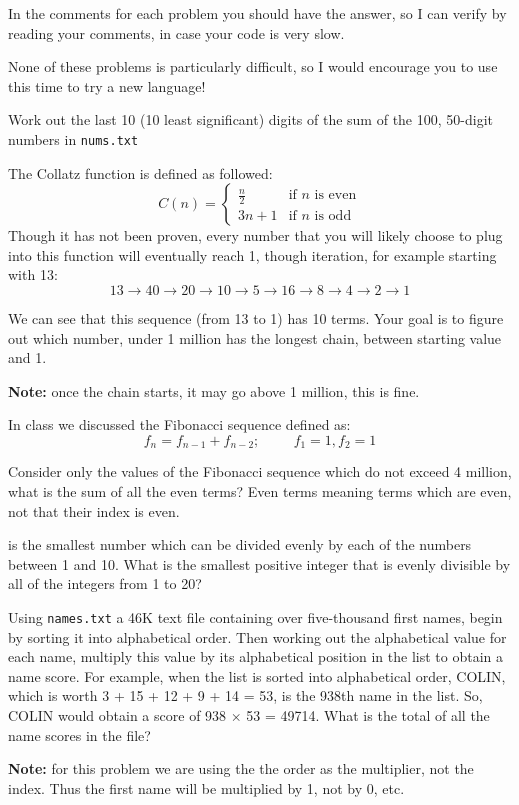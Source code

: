 \documentclass[addpoints]{exam}
\begin{document}
In the comments for each problem you should have the answer, so I can verify by
reading your comments, in case your code is very slow.

None of these problems is particularly difficult, so I would encourage you to
use this time to try a new language!

\begin{questions}
  \question[10] Work out the last 10 (10 least significant) digits of the sum of
  the 100, 50-digit numbers in \texttt{nums.txt}

  \question[10] The Collatz function is defined as followed:
  \[
    C(n) = \begin{cases}
      \frac n2 & \mbox{if } n \text{ is even}\\
      3n+1 & \mbox{if } n \text{ is odd}
    \end{cases}
  \]
  Though it has not been proven, every number that you will likely choose to
  plug into this function will eventually reach 1, though iteration, for example
  starting with 13:
  \[
    13 \to 40 \to 20 \to 10 \to 5 \to 16 \to 8 \to 4 \to 2 \to 1
  \]

  We can see that this sequence (from 13 to 1) has 10 terms. Your goal is to
  figure out which number, under 1 million has the longest chain, between
  starting value and 1.

  \textbf{Note:} once the chain starts, it may go above 1 million, this is
  fine.

  \question[25] In class we discussed the Fibonacci sequence defined as: 
  \[
    f_n = f_{n-1} + f_{n-2}; \hspace{1cm} f_1 = 1, f_2 =1
  \]

  Consider only the values of the Fibonacci sequence which do not exceed 4
  million, what is the sum of all the even terms? Even terms meaning terms which
  are even, not that their index is even.

   is the smallest number which can be divided evenly by each
  of the numbers between 1 and 10. What is the smallest positive integer that is
  evenly divisible by all of the integers from 1 to 20?

  \question[30] Using \texttt{names.txt} a 46K text file containing over
  five-thousand first names, begin by sorting it into alphabetical order. Then
  working out the alphabetical value for each name, multiply this value by its
  alphabetical position in the list to obtain a name score. For example, when
  the list is sorted into alphabetical order, COLIN, which is worth 3 + 15 + 12
  + 9 + 14 = 53, is the 938th name in the list. So, COLIN would obtain a score
  of 938 $\times$ 53 = 49714. What is the total of all the name scores in the
  file?

  \textbf{Note:} for this problem we are using the the order as the multiplier,
  not the index. Thus the first name will be multiplied by 1, not by 0, etc.

\end{questions}
\end{document}
